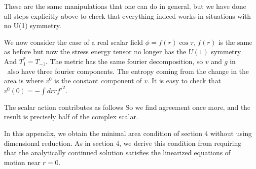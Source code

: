 These are the same manipulations that one can do in general, but we have done all steps explicitly above
to check that everything  indeed works in situations with no U(1) symmetry.






We now consider the case of a
 real scalar field $\phi=f(r) \cos  \tau$, $f(r)$ is the same as before but now
 the stress energy tensor  no longer has the $U(1)$ symmetry
\eqn{}
And $T_1^*=T_{-1}$. The metric has the same fourier decomposition, so $v$ and $g$ in \pertmetric\
also have three fourier components.
The entropy coming from the change in the area is
\eqn{}
where $v^0$ is the constant component of $v$. It is easy to check that $v^0(0)=-\int dr r f'^2$.

The scalar action contributes as follows
\eqn{}
So we find agreement once more, and the result is precisely half of the complex scalar.



In this appendix, we   obtain the minimal area condition of section 4 without using dimensional reduction. As in section 4, we   derive this condition from requiring that the analytically continued solution satisfies the linearized equations of motion near $r=0$.

